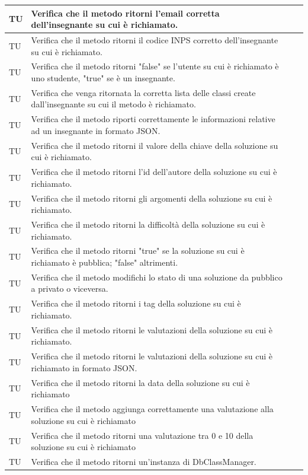 \begin{longtable}{|>{\centering\arraybackslash}m{1.6cm}|>{\centering\arraybackslash}m{6.41cm}|>{\centering\arraybackslash}m{3.1cm}| c |}
		TU & Verifica che il metodo ritorni l'email corretta dell'insegnante su cui è richiamato. \\ \hline
		TU & Verifica che il metodo ritorni il codice INPS corretto dell'insegnante su cui è richiamato. \\ \hline
		TU & Verifica che il metodo ritorni "false" se l'utente su cui è richiamato è uno studente, "true" se è un insegnante. \\ \hline
		TU & Verifica che venga ritornata la corretta lista delle classi create dall'insegnante su cui il metodo è richiamato.  \\ \hline
		TU & Verifica che il metodo riporti correttamente le informazioni relative ad un insegnante in formato JSON. \\ \hline	
		TU & Verifica che il metodo ritorni il valore della chiave della soluzione su cui è richiamato.  \\ \hline
		TU & Verifica che il metodo ritorni l'id dell'autore della soluzione su cui è richiamato. \\ \hline
		TU & Verifica che il metodo ritorni gli argomenti della soluzione su cui è richiamato. \\ \hline
		TU & Verifica che il metodo ritorni la difficoltà della soluzione su cui è richiamato. \\ \hline
		TU & Verifica che il metodo ritorni "true" se la soluzione su cui è richiamato è pubblica; "false" altrimenti. \\ \hline
		TU & Verifica che il metodo modifichi lo stato di una soluzione da pubblico a privato o viceversa. \\ \hline
		TU & Verifica che il metodo ritorni i tag della soluzione su cui è richiamato. \\ \hline
		TU & Verifica che il metodo ritorni le valutazioni della soluzione su cui è richiamato. \\ \hline
		TU & Verifica che il metodo ritorni le valutazioni della soluzione su cui è richiamato in formato JSON.\\ \hline
		TU & Verifica che il metodo ritorni la data della soluzione su cui è richiamato \\ \hline
		TU & Verifica che il metodo aggiunga correttamente una valutazione alla soluzione su cui è richiamato\\ \hline
		TU & Verifica che il metodo ritorni una valutazione tra 0 e 10 della soluzione su cui è richiamato \\ \hline
		TU & Verifica che il metodo ritorni un'instanza di DbClassManager.  \\ \hline

\end{longtable}
